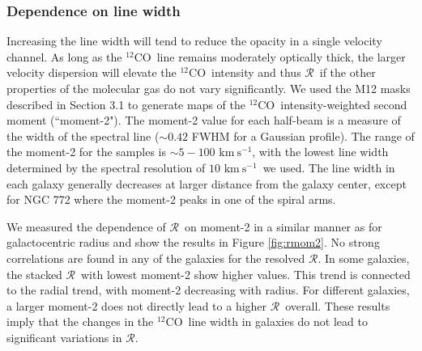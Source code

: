 \documentclass{emulateapj}
\def\ttco{\mbox{$^{13}$CO}}
\def\twco{\mbox{$^{12}$CO}}
\def\rtt{$\mathcal{R}$}
\def\itw{$I_{12}$}
\newcommand{\kms}{$\mathrm{km~s^{-1}}$}
\begin{document}
\subsubsection{Dependence on line width}

\begin{figure*}[ht]
\caption{
Line intensity ratio \rtt \ as a function of moment-2. 
The first 11 panels show the results for each individual galaxy, 
excluding NGC 1569.
Colored circles show the ratios for individual half-beams; 
the filled ones are those used for deriving 
Spearman's rank correlation coefficient $r_s$ and 
the significance $P$ shown in the top right of each panel. 
The gray scales show the distribution of 
\rtt$_{\rm min} = $\itw$/3\sigma_{13}$ for the \ttco\ non-detections. 
The black circles and arrows are the  stacked \rtt \ and lower limits of \rtt \ 
as a function of moment-2 respectively; 
the horizontal error bars reflect the bin size, and the vertical error bars show their uncertainties. 
The last panel is a summary plot showing trends of the stacked \rtt,
with different colors representing different galaxies.
}
\label{fig:rmom2}
\end{figure*}

Increasing the line width will tend to reduce the opacity in a single velocity channel. 
As long as the \twco \ line remains moderately optically thick, 
the larger velocity dispersion will elevate the \twco \ intensity and thus 
\rtt \ if the other properties of the molecular gas do not vary significantly. 
We used the M12 masks described in Section 3.1 to generate 
maps of the \twco \ intensity-weighted second moment (``moment-2"). 
The moment-2 value for each half-beam is a measure of 
the width of the spectral line ($\sim 0.42$ FWHM for a Gaussian profile).  
The range of the moment-2 for the samples is $\sim 5 - 100$
\kms, with the lowest line width determined by the spectral resolution 
of $10$ \kms \ we used. 
The line width in each galaxy generally decreases at larger 
distance from the galaxy center, except for NGC 772 where 
the moment-2 peaks in one of the spiral arms. 


We measured the dependence of \rtt \ on moment-2 in
a similar manner as for galactocentric radius and show the results in Figure \ref{fig:rmom2}.
No strong correlations are found in any of the
galaxies for the resolved \rtt. 
In some galaxies, the stacked \rtt \ with lowest moment-2 show higher values. 
This trend is connected to the radial trend, with moment-2 decreasing with radius. 
For different galaxies, a larger moment-2 does not directly 
lead to a higher \rtt \ overall. 
These results imply that the changes in the \twco\ line width in galaxies 
do not lead to significant variations in \rtt. 
\end{document}
